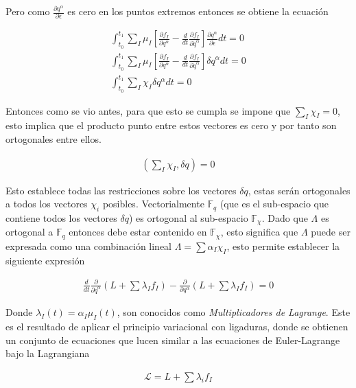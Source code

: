 Pero como $\frac{\partial q^{\alpha}}{\partial \epsilon}$ es cero en los puntos extremos entonces se obtiene la ecuación

\begin{gather*}
    \int_{t_0}^{t_1} \sum_I \mu_I \left[\frac{\partial f_I}{\partial q^{\alpha}} - \frac{d}{dt}\frac{\partial f_I}{\partial \dot{q}^{\alpha}}\right]\frac{\partial q^{\alpha}}{\partial \epsilon}dt = 0\\
    \int_{t_0}^{t_1} \sum_I \mu_I \left[\frac{\partial f_I}{\partial q^{\alpha}} - \frac{d}{dt}\frac{\partial f_I}{\partial \dot{q}^{\alpha}}\right]\delta q^{\alpha}dt = 0\\
    \int_{t_0}^{t_1} \sum_I  \chi_I \delta q^{\alpha}dt = 0
\end{gather*}

Entonces como se vio antes, para que esto se cumpla se impone que $\sum_I  \chi_I = 0$, esto implica que el producto punto entre estos vectores es cero y por tanto son ortogonales entre ellos.

\begin{gather}
    \left(\sum_I \chi_I , \delta q \right) = 0
\end{gather}

Esto establece todas las restricciones sobre los vectores $\delta q$, estas serán ortogonales a todos los vectores $\chi_i$ posibles. Vectorialmente $\mathbb{F}_q$ (que es el sub-espacio que contiene todos los vectores $\delta q$) es ortogonal al sub-espacio $\mathbb{F}_\chi$. Dado que $\Lambda$ es ortogonal a $\mathbb{F}_q$ entonces debe estar contenido en $\mathbb{F}_\chi$, esto significa que $\Lambda$ puede ser expresada como una combinación lineal $\Lambda = \sum \alpha_I \chi_I$, esto permite establecer la siguiente expresión 

\begin{gather}
    \label{eq:EL-L}\frac{d}{dt}\frac{\partial}{\partial \dot{q}^{\alpha}}\left(L + \sum \lambda_I f_I\right) - \frac{\partial}{\partial q^{\alpha}}\left(L + \sum \lambda_I f_I\right) = 0
\end{gather}

Donde $\lambda_I(t) = \alpha_I\mu_I(t)$, son conocidos como \textit{Multiplicadores de Lagrange}. Este es el resultado de aplicar el principio variacional con ligaduras, donde se obtienen un conjunto de ecuaciones que lucen similar a las ecuaciones de Euler-Lagrange bajo la Lagrangiana

\begin{gather*}
    \mathcal{L} = L + \sum \lambda_i f_I
\end{gather*}

